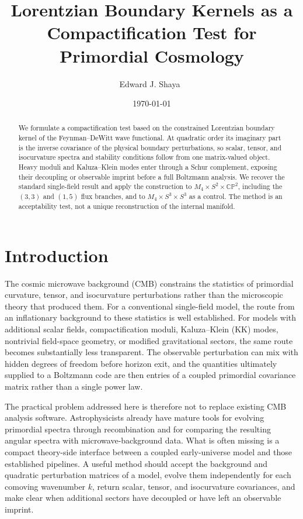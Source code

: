 \documentclass[aps,prd,twocolumn,superscriptaddress,nofootinbib,longbibliography,floatfix]{revtex4-2}
\newcommand{\CP}{\mathbb{CP}}
\begin{document}
\title{Lorentzian Boundary Kernels as a Compactification Test for Primordial Cosmology}

\author{Edward J. Shaya\ }



\date{\today}

\begin{abstract}
We formulate a compactification test based on the constrained Lorentzian boundary kernel of the Feynman--DeWitt wave functional. At quadratic order its imaginary part is the inverse covariance of the physical boundary perturbations, so scalar, tensor, and isocurvature spectra and stability conditions follow from one matrix-valued object. Heavy moduli and Kaluza--Klein modes enter through a Schur complement, exposing their decoupling or observable imprint before a full Boltzmann analysis. We recover the standard single-field result and apply the construction to $M_4\times S^2\times\CP^2$, including the $(3,3)$ and $(1,5)$ flux branches, and to $M_4\times S^3\times S^3$ as a control. The method is an acceptability test, not a unique reconstruction of the internal manifold.
\end{abstract}

\maketitle

\section{Introduction}
The cosmic microwave background (CMB) constrains the statistics of primordial curvature, tensor, and isocurvature perturbations rather than the microscopic theory that produced them.  For a conventional single-field model, the route from an inflationary background to these statistics is well established.  For models with additional scalar fields, compactification moduli, Kaluza--Klein (KK) modes, nontrivial field-space geometry, or modified gravitational sectors, the same route becomes substantially less transparent.  The observable perturbation can mix with hidden degrees of freedom before horizon exit, and the quantities ultimately supplied to a Boltzmann code are then entries of a coupled primordial covariance matrix rather than a single power law.

The practical problem addressed here is therefore not to replace existing CMB analysis software.  Astrophysicists already have mature tools for evolving primordial spectra through recombination and for comparing the resulting angular spectra with microwave-background data.  What is often missing is a compact theory-side interface between a coupled early-universe model and those established pipelines.  A useful method should accept the background and quadratic perturbation matrices of a model, evolve them independently for each comoving wavenumber $k$, return scalar, tensor, and isocurvature covariances, and make clear when additional sectors have decoupled or have left an observable imprint.
\end{document}
